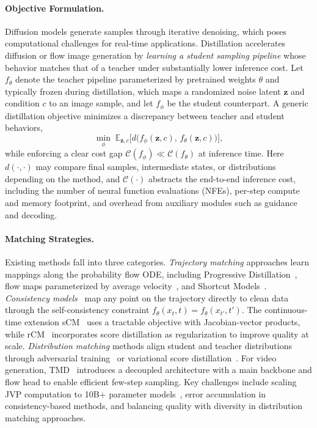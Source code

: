 \documentclass{llmxive}
\begin{document}
\paragraph{Objective Formulation.}
Diffusion models generate samples through iterative denoising, which poses computational challenges for real-time applications.
Distillation accelerates diffusion or flow image generation by \emph{learning a student sampling pipeline} whose behavior matches that of a teacher under substantially lower inference cost.
Let $f_{\theta}$ denote the teacher pipeline parameterized by pretrained weights $\theta$ and typically frozen during distillation, which maps a randomized noise latent $\mathbf{z}$ and condition $c$ to an image sample, and let $f_{\phi}$ be the student counterpart.
A generic distillation objective minimizes a discrepancy between teacher and student behaviors,
\begin{equation}
\min_{\phi}\;\mathbb{E}_{\mathbf{z},c}\Big[d\big(f_{\phi}(\mathbf{z},c),\,f_{\theta}(\mathbf{z},c)\big)\Big],
\label{eq:distill_generic}
\end{equation}
while enforcing a clear cost gap $\mathcal{C}(f_{\phi}) \ll \mathcal{C}(f_{\theta})$ at inference time.
Here $d(\cdot,\cdot)$ may compare final samples, intermediate states, or distributions depending on the method, and $\mathcal{C}(\cdot)$ abstracts the end-to-end inference cost, including the number of neural function evaluations (NFEs), per-step compute and memory footprint, and overhead from auxiliary modules such as guidance and decoding.

\paragraph{Matching Strategies.}
Existing methods fall into three categories. \textit{Trajectory matching} approaches learn mappings along the probability flow ODE, including Progressive Distillation~\citep{salimans2022progressive}, flow maps parameterized by average velocity~\citep{geng2025mean}, and Shortcut Models~\citep{frans2024one}. \textit{Consistency models}~\citep{song2023consistency} map any point on the trajectory directly to clean data through the self-consistency constraint $f_\theta(x_t, t) = f_\theta(x_{t'}, t')$. The continuous-time extension sCM~\citep{lu2024simplifying} uses a tractable objective with Jacobian-vector products, while rCM~\citep{zheng2025rcm} incorporates score distillation as regularization to improve quality at scale. \textit{Distribution matching} methods align student and teacher distributions through adversarial training~\citep{sauer2024adversarial} or variational score distillation~\citep{yin2024one,yin2024improved}. For video generation, TMD~\citep{nie2026tmd} introduces a decoupled architecture with a main backbone and flow head to enable efficient few-step sampling. Key challenges include scaling JVP computation to 10B+ parameter models~\citep{zheng2025rcm}, error accumulation in consistency-based methods, and balancing quality with diversity in distribution matching approaches.
\end{document}

